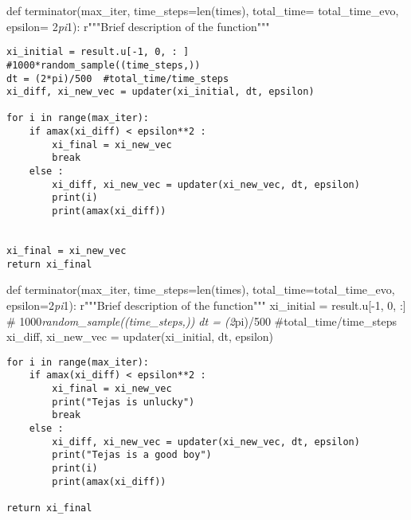 \documentclass[11pt]{article}
\begin{document}
    def terminator(max\_iter, time\_steps=len(times), total\_time=
total\_time\_evo, epsilon= 2\emph{pi}1): r"""Brief description of the
function"""

\begin{verbatim}
xi_initial = result.u[-1, 0, : ] 
#1000*random_sample((time_steps,))
dt = (2*pi)/500  #total_time/time_steps
xi_diff, xi_new_vec = updater(xi_initial, dt, epsilon)

for i in range(max_iter):
    if amax(xi_diff) < epsilon**2 :
        xi_final = xi_new_vec
        break
    else :
        xi_diff, xi_new_vec = updater(xi_new_vec, dt, epsilon)
        print(i)
        print(amax(xi_diff))
        
    
xi_final = xi_new_vec    
return xi_final
\end{verbatim}

    def terminator(max\_iter, time\_steps=len(times),
total\_time=total\_time\_evo, epsilon=2\emph{pi}1): r"""Brief
description of the function""" xi\_initial = result.u{[}-1, 0, :{]} \#
1000\emph{random\_sample((time\_steps,)) dt = (2}pi)/500
\#total\_time/time\_steps xi\_diff, xi\_new\_vec = updater(xi\_initial,
dt, epsilon)

\begin{verbatim}
for i in range(max_iter):
    if amax(xi_diff) < epsilon**2 :
        xi_final = xi_new_vec
        print("Tejas is unlucky")
        break
    else :
        xi_diff, xi_new_vec = updater(xi_new_vec, dt, epsilon)
        print("Tejas is a good boy")
        print(i)
        print(amax(xi_diff))

return xi_final
\end{verbatim}
\end{document}
